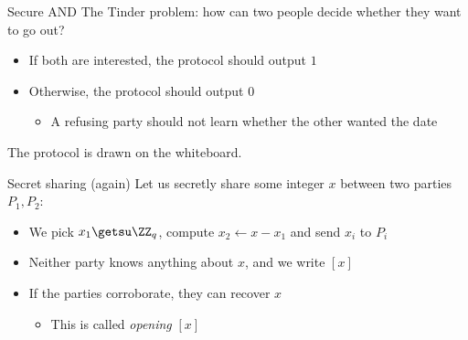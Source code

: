 \begin{frame}{Secure AND}
  \pause
  The Tinder problem: how can two people decide whether they want to go out?
  \begin{itemize}[<+(1)->]
    \item If both are interested, the protocol should output $1$
    \item Otherwise, the protocol should output $0$
    \begin{itemize}
      \item A refusing party should not learn whether the other wanted the date
    \end{itemize}
  \end{itemize}

  \vspace*{1em}

  \pause
  The protocol is drawn on the whiteboard.
\end{frame}

\begin{frame}{Secret sharing (again)}
  Let us secretly share some integer $x$ between two parties $P_1, P_2$:
  \begin{itemize}[<+(1)->]
    \item We pick $x_1 \getsu \ZZ_q$, compute $x_2 \gets x - x_1$ and send $x_i$ to $P_i$
    \item Neither party knows anything about $x$, and we write $[x]$
    \item If the parties corroborate, they can recover $x$
    \begin{itemize}
      \item This is called \emph{opening} $[x]$
    \end{itemize}
  \end{itemize}
\end{frame}

